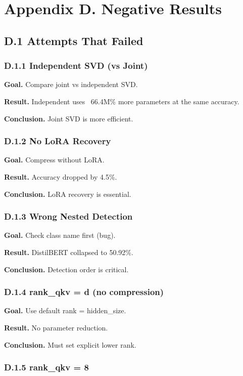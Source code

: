 \section{Appendix D. Negative Results}

\subsection{D.1 Attempts That Failed}

\subsubsection{D.1.1 Independent SVD (vs Joint)}

\textbf{Goal.} Compare joint vs independent SVD.

\textbf{Result.} Independent uses ~66.4M\% more parameters at the 
same accuracy.

\textbf{Conclusion.} Joint SVD is more efficient.

\subsubsection{D.1.2 No LoRA Recovery}

\textbf{Goal.} Compress without LoRA.

\textbf{Result.} Accuracy dropped by 4.5\%.

\textbf{Conclusion.} LoRA recovery is essential.

\subsubsection{D.1.3 Wrong Nested Detection}

\textbf{Goal.} Check class name first (bug).

\textbf{Result.} DistilBERT collapsed to 50.92\%.

\textbf{Conclusion.} Detection order is critical.

\subsubsection{D.1.4 rank\_qkv = d (no compression)}

\textbf{Goal.} Use default rank = hidden\_size.

\textbf{Result.} No parameter reduction.

\textbf{Conclusion.} Must set explicit lower rank.

\subsubsection{D.1.5 rank\_qkv = 8}

